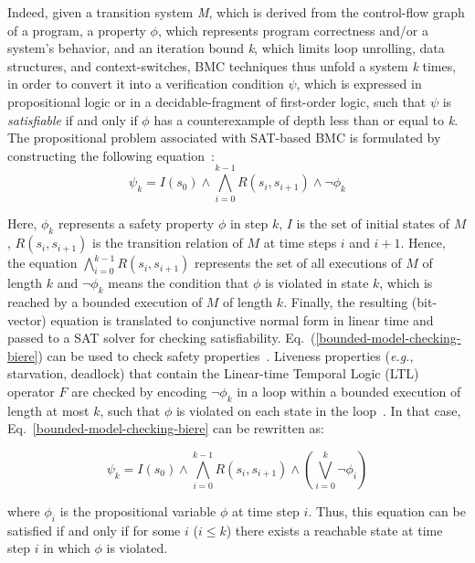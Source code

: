 \documentclass{cta-author}
\begin{document}
Indeed, given a transition system \textit{M}, which is derived from the control-flow graph of a program, a property $\phi$, which represents program correctness and/or a system's behavior, and an iteration bound \textit{k}, which limits loop unrolling, data structures, and context-switches, BMC techniques thus unfold a system \textit{k} times, in order to convert it into a verification condition $\psi$, which is expressed in propositional logic or in a decidable-fragment of first-order logic, such that $\psi$ is \textit{satisfiable} if and only if $\phi$ has a counterexample of depth less than or equal to \textit{k}. The propositional problem associated with SAT-based BMC is formulated by constructing the following equation~\cite{Biere99}:
%
\begin{equation}
\label{bounded-model-checking-biere}
\psi_{k} = I\left(s_{0}\right) \wedge \bigwedge^{k-1}_{i=0} R\left(s_{i},s_{i+1}\right) \wedge \neg \phi_{k}
\end{equation}

\noindent Here, $\phi_{k}$ represents a safety property $\phi$ in step $k$, $I$ is the set of initial states of $M$, $R\left(s_{i},s_{i+1}\right)$ is the transition relation of $M$ at time steps $i$ and $i+1$. Hence, the equation $\bigwedge^{k-1}_{i=0} R\left(s_{i},s_{i+1}\right)$ represents the set of all executions of $M$ of length $k$ and $\neg \phi_{k}$ means the condition that $\phi$ is violated in state $k$, which is reached by a bounded execution of $M$ of length $k$. Finally, the resulting (bit-vector) equation is translated to conjunctive normal form in linear time and passed to a SAT solver for checking satisfiability. Eq.~(\ref{bounded-model-checking-biere}) can be used to check safety properties~\cite{PrasadBG05}. Liveness properties ({\it e.g.}, starvation, deadlock) that contain the Linear-time Temporal Logic (LTL) operator $F$ are checked by encoding $\neg \phi_{k}$ in a loop within a bounded execution of length at most $k$, such that $\phi$ is violated on each state in the loop~\cite{JMorse15}. In that case, Eq.~\ref{bounded-model-checking-biere} can be rewritten as:

%
\begin{equation}
\psi_{k} = I\left(s_{0}\right) \wedge \bigwedge^{k-1}_{i=0} R\left(s_{i},s_{i+1}\right) \wedge \left(\bigvee^{k}_{i=0} \neg \phi_{i}\right)
\end{equation}

\noindent where $\phi_{i}$ is the propositional variable $\phi$ at time step $i$. Thus, this equation can be satisfied if and only if for some $i$ ($i \leq k$) there exists a reachable state at time step $i$ in which $\phi$ is violated. 
\end{document}
